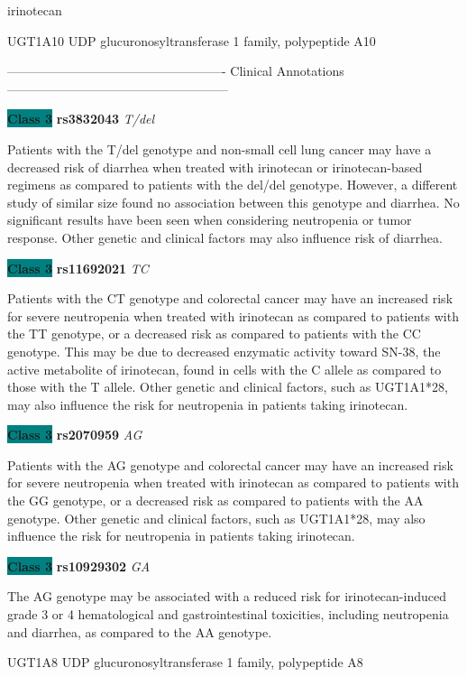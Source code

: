 \documentclass{resume} %
\begin{document}
\begin{rSection}{ irinotecan }
\begin{rSubsection}{ UGT1A10 }{ UDP glucuronosyltransferase 1 family, polypeptide A10 }{}{}
\item[] ---------------------------------------------------- Clinical Annotations -----------------------------------------------------\newline
\item \textbf{\colorbox{teal} {Class 3}} \textbf{ rs3832043 } \textit{ T/del }
\item[] Patients with the T/del genotype and non-small cell lung cancer may have a decreased risk of diarrhea when treated with irinotecan or irinotecan-based regimens as compared to patients with the del/del genotype. However, a different study of similar size found no association between this genotype and diarrhea. No significant results have been seen when considering neutropenia or tumor response. Other genetic and clinical factors may also influence risk of diarrhea.\item \textbf{\colorbox{teal} {Class 3}} \textbf{ rs11692021 } \textit{ TC }
\item[] Patients with the CT genotype and colorectal cancer may have an increased risk for severe neutropenia when treated with irinotecan as compared to patients with the TT genotype, or a decreased risk as compared to patients with the CC genotype. This may be due to decreased enzymatic activity toward SN-38, the active metabolite of irinotecan, found in cells with the C allele as compared to those with the T allele. Other genetic and clinical factors, such as UGT1A1*28, may also influence the risk for neutropenia in patients taking irinotecan.\item \textbf{\colorbox{teal} {Class 3}} \textbf{ rs2070959 } \textit{ AG }
\item[] Patients with the AG genotype and colorectal cancer may have an increased risk for severe neutropenia when treated with irinotecan as compared to patients with the GG genotype, or a decreased risk as compared to patients with the AA genotype. Other genetic and clinical factors, such as UGT1A1*28, may also influence the risk for neutropenia in patients taking irinotecan.\item \textbf{\colorbox{teal} {Class 3}} \textbf{ rs10929302 } \textit{ GA }
\item[] The AG genotype may be associated with a reduced risk for irinotecan-induced grade 3 or 4 hematological and gastrointestinal toxicities, including neutropenia and diarrhea, as compared to the AA genotype. 
\end{rSubsection}\begin{rSubsection}{ UGT1A8 }{ UDP glucuronosyltransferase 1 family, polypeptide A8 }{}{}
\item[]


\end{rSubsection}
\end{rSection}
\end{document}
